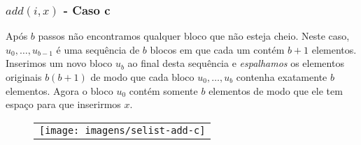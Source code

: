 \documentclass{beamer}
\begin{document}
\begin{frame}[shrink]
\frametitle{$add(i,x)$ - Caso c}
Após $ \ensuremath{\ensuremath{\mathit{b}}}$ passos não encontramos qualquer bloco que não esteja cheio. Neste caso,  $\ensuremath{\ensuremath{\ensuremath{\mathit{u}}}}_0,\ldots,\ensuremath{\ensuremath{\ensuremath{\mathit{u}}}}_{\ensuremath{\ensuremath{\ensuremath{\mathit{b}}}}-1}$ é uma sequência de \ensuremath{\ensuremath{\ensuremath{\mathit{b}}}} blocos em que cada um contém $\ensuremath{\ensuremath{\ensuremath{\mathit{b}}}}+1$ elementos.  Inserimos um novo bloco $\ensuremath{\ensuremath{\ensuremath{\mathit{u}}}}_{\ensuremath{\ensuremath{\ensuremath{\mathit{b}}}}}$
ao final desta sequência e \emph{espalhamos} os elementos originais $\ensuremath{\ensuremath{\ensuremath{\mathit{b}}}}(\ensuremath{\ensuremath{\ensuremath{\mathit{b}}}}+1)$
de modo que cada bloco $\ensuremath{\ensuremath{\ensuremath{\mathit{u}}}}_0,\ldots,\ensuremath{\ensuremath{\ensuremath{\mathit{u}}}}_{\ensuremath{\ensuremath{\ensuremath{\mathit{b}}}}}$ contenha exatamente
\ensuremath{\ensuremath{\ensuremath{\mathit{b}}}} elementos.  Agora o bloco $\ensuremath{\ensuremath{\ensuremath{\mathit{u}}}}_0$ contém somente  \ensuremath{\ensuremath{\ensuremath{\mathit{b}}}} elementos de modo que ele tem espaço para que inserirmos \ensuremath{\ensuremath{\ensuremath{\mathit{x}}}}.
\begin{figure}
  \noindent
  \begin{center}
    \begin{tabular}{@{}l@{}}
      \texttt{[image: imagens/selist-add-c]}\\[4ex]
    \end{tabular}
  \end{center}
\end{figure}
\end{frame}
\end{document}

